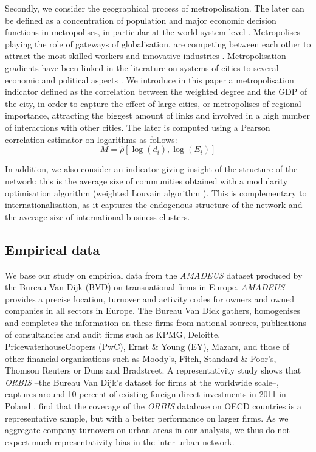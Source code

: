 \documentclass[10pt,letterpaper]{article}
\begin{document}
Secondly, we consider the geographical process of metropolisation. The later can be defined as a concentration of population and major economic decision functions in metropolises, in particular at the world-system level \cite{Sassen1991}. Metropolises playing the role of gateways of globalisation, are competing between each other to attract the most skilled workers and innovative industries \cite{RozenblatPumain2007}. Metropolisation gradients have been linked in the literature on systems of cities to several economic and political aspects \cite{RozenblatPumain2018} \cite{PumainRozenblat2019} \cite{Zdanowskaetal2020}. We introduce in this paper a metropolisation indicator defined as the correlation between the weighted degree and the GDP of the city, in order to capture the effect of large cities, or metropolises of regional importance, attracting the biggest amount of links and involved in a high number of interactions with other cities.  The later is computed using a Pearson correlation estimator on logarithms as follows:
\begin{equation}
    M = \hat{\rho} \left[\log (d_i) , \log (E_i) \right]
\end{equation}

In addition, we also consider an indicator giving insight of the structure of the network: this is the average size of communities obtained with a modularity optimisation algorithm (weighted Louvain algorithm \cite{blondel2008fast}). This is complementary to internationalisation, as it captures the endogenous structure of the network and the average size of international business clusters.


\subsection*{Empirical data}

We base our study on empirical data from the \emph{AMADEUS} dataset produced by the Bureau Van Dijk (BVD) on transnational firms in Europe. \emph{AMADEUS} provides a precise location, turnover and activity codes for owners and owned companies in all sectors in Europe. The Bureau Van Dick gathers, homogenises and completes the information on these firms from national sources, publications of consultancies and audit firms such as KPMG, Deloitte, PricewaterhouseCoopers (PwC), Ernst \& Young (EY), Mazars, and those of other financial organisations such as Moody's, Fitch, Standard \& Poor's, Thomson Reuters or Duns and Bradstreet. A representativity study shows that \emph{ORBIS} --the Bureau Van Dijk's dataset for firms at the worldwide scale--, captures around 10 percent of existing foreign direct investments in 2011 in Poland \cite{Zdanowska2018}. \cite{bajgar2020coverage} find that the coverage of the \emph{ORBIS} database on OECD countries is a representative sample, but with a better performance on larger firms. As we aggregate company turnovers on urban areas in our analysis, we thus do not expect much representativity bias in the inter-urban network.
\end{document}
